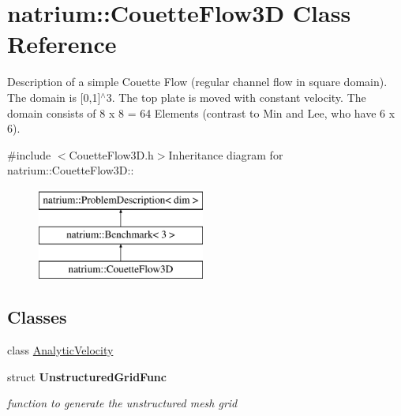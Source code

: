 \hypertarget{classnatrium_1_1CouetteFlow3D}{
\section{natrium::CouetteFlow3D Class Reference}
\label{classnatrium_1_1CouetteFlow3D}
}


Description of a simple Couette Flow (regular channel flow in square domain). The domain is \mbox{[}0,1\mbox{]}$^\wedge$3. The top plate is moved with constant velocity. The domain consists of 8 x 8 = 64 Elements (contrast to Min and Lee, who have 6 x 6).  


{\ttfamily \#include $<$CouetteFlow3D.h$>$}Inheritance diagram for natrium::CouetteFlow3D::\begin{figure}[H]
\begin{center}
\leavevmode
\includegraphics[height=3cm]{classnatrium_1_1CouetteFlow3D}
\end{center}
\end{figure}
\subsection*{Classes}
\begin{DoxyCompactItemize}
\item 
class \hyperlink{classnatrium_1_1CouetteFlow3D_1_1AnalyticVelocity}{AnalyticVelocity}
\item 
struct {\bfseries UnstructuredGridFunc}
\begin{DoxyCompactList}\small\item\em function to generate the unstructured mesh grid \item\end{DoxyCompactList}\end{DoxyCompactItemize}
